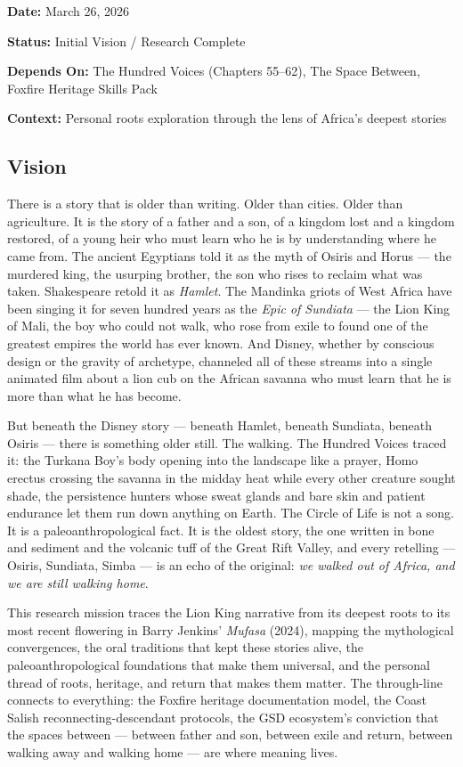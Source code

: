 \documentclass[11pt,letterpaper]{article}
\newcommand{\metafield}[2]{\textbf{\sffamily #1} #2\par}
\begin{document}
\metafield{Date:}{March 26, 2026}
\metafield{Status:}{Initial Vision / Research Complete}
\metafield{Depends On:}{The Hundred Voices (Chapters 55--62), The Space Between, Foxfire Heritage Skills Pack}
\metafield{Context:}{Personal roots exploration through the lens of Africa's deepest stories}

\subsection{Vision}

There is a story that is older than writing. Older than cities. Older than agriculture. It is the story of a father and a son, of a kingdom lost and a kingdom restored, of a young heir who must learn who he is by understanding where he came from. The ancient Egyptians told it as the myth of Osiris and Horus --- the murdered king, the usurping brother, the son who rises to reclaim what was taken. Shakespeare retold it as \textit{Hamlet}. The Mandinka griots of West Africa have been singing it for seven hundred years as the \textit{Epic of Sundiata} --- the Lion King of Mali, the boy who could not walk, who rose from exile to found one of the greatest empires the world has ever known. And Disney, whether by conscious design or the gravity of archetype, channeled all of these streams into a single animated film about a lion cub on the African savanna who must learn that he is more than what he has become.

But beneath the Disney story --- beneath Hamlet, beneath Sundiata, beneath Osiris --- there is something older still. The walking. The Hundred Voices traced it: the Turkana Boy's body opening into the landscape like a prayer, Homo erectus crossing the savanna in the midday heat while every other creature sought shade, the persistence hunters whose sweat glands and bare skin and patient endurance let them run down anything on Earth. The Circle of Life is not a song. It is a paleoanthropological fact. It is the oldest story, the one written in bone and sediment and the volcanic tuff of the Great Rift Valley, and every retelling --- Osiris, Sundiata, Simba --- is an echo of the original: \textit{we walked out of Africa, and we are still walking home}.

This research mission traces the Lion King narrative from its deepest roots to its most recent flowering in Barry Jenkins' \textit{Mufasa} (2024), mapping the mythological convergences, the oral traditions that kept these stories alive, the paleoanthropological foundations that make them universal, and the personal thread of roots, heritage, and return that makes them matter. The through-line connects to everything: the Foxfire heritage documentation model, the Coast Salish reconnecting-descendant protocols, the GSD ecosystem's conviction that the spaces between --- between father and son, between exile and return, between walking away and walking home --- are where meaning lives.
\end{document}
